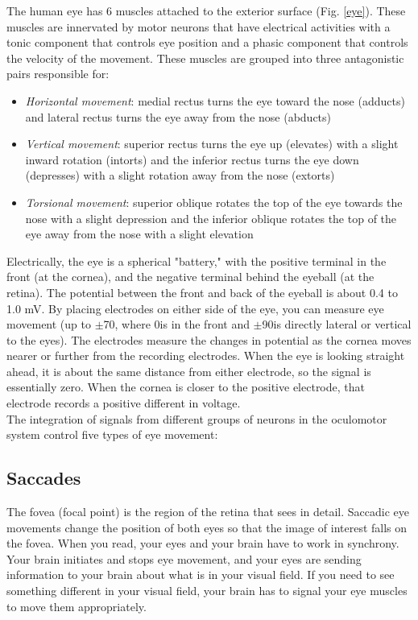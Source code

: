 \documentclass{article}
\begin{document}
The human eye has 6 muscles attached to the exterior surface (Fig. \ref{eye}). These muscles are innervated by motor neurons that have electrical activities with a tonic component that controls eye position and a phasic component that controls the velocity of the movement. These muscles are grouped into three antagonistic pairs responsible for:
\begin{itemize}
	\item \textit{Horizontal movement}: medial rectus turns the eye toward the nose (adducts) and lateral rectus turns the eye away from the nose (abducts)
	\item \textit{Vertical movement}: superior rectus turns the eye up (elevates) with a slight inward rotation (intorts) and the inferior rectus turns the eye down (depresses) with a slight rotation away from the nose (extorts)
	\item \textit{Torsional movement}: superior oblique rotates the top of the eye towards the nose with a slight depression and the inferior oblique rotates the top of the eye away from the nose with a slight elevation
\end{itemize}

Electrically, the eye is a spherical "battery," with the positive terminal in the front (at the cornea), and the negative terminal behind the eyeball (at the retina). The potential between the front and back of the eyeball is about 0.4 to 1.0 mV. By placing electrodes on either side of the eye, you can measure eye movement (up to $\pm$70\degree, where 0\degree is in the front and $\pm$90\degree is directly lateral or vertical to the eyes). The electrodes measure the changes in potential as the cornea moves nearer or further from the recording electrodes. When the eye is looking straight ahead, it is about the same distance from either electrode, so the signal is essentially zero. When the cornea is closer to the positive electrode, that electrode records a positive different in voltage.\\

The integration of signals from different groups of neurons in the oculomotor system control five types of eye movement:
\subsection*{Saccades}
The fovea (focal point) is the region of the retina that sees in detail. Saccadic eye movements change the position of both eyes so that the image of interest falls on the fovea. When you read, your eyes and your brain have to work in synchrony. Your brain initiates and stops eye movement, and your eyes are sending information to your brain about what is in your visual field. If you need to see something different in your visual field, your brain has to signal your eye muscles to move them appropriately.\\
\end{document}
